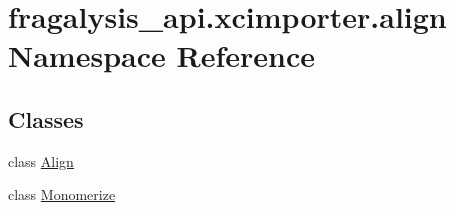 \hypertarget{namespacefragalysis__api_1_1xcimporter_1_1align}{}\section{fragalysis\+\_\+api.\+xcimporter.\+align Namespace Reference}
\label{namespacefragalysis__api_1_1xcimporter_1_1align}
\subsection*{Classes}
\begin{DoxyCompactItemize}
\item 
class \hyperlink{classfragalysis__api_1_1xcimporter_1_1align_1_1_align}{Align}
\item 
class \hyperlink{classfragalysis__api_1_1xcimporter_1_1align_1_1_monomerize}{Monomerize}
\end{DoxyCompactItemize}
